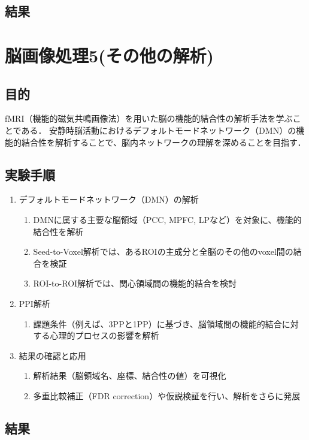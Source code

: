 \documentclass{jlreq}
\begin{document}
\subsection{結果}

\section{脳画像処理5(その他の解析)}
\subsection{目的}
fMRI（機能的磁気共鳴画像法）を用いた脳の機能的結合性の解析手法を学ぶことである．
安静時脳活動におけるデフォルトモードネットワーク（DMN）の機能的結合性を解析することで、脳内ネットワークの理解を深めることを目指す．
\subsection{実験手順}
\begin{enumerate}
    \item デフォルトモードネットワーク（DMN）の解析
    \begin{enumerate}
        \item DMNに属する主要な脳領域（PCC, MPFC, LPなど）を対象に、機能的結合性を解析
        \item Seed-to-Voxel解析では、あるROIの主成分と全脳のその他のvoxel間の結合を検証
        \item ROI-to-ROI解析では、関心領域間の機能的結合を検討
    \end{enumerate}

    \item PPI解析 
    \begin{enumerate}
        \item 課題条件（例えば、3PPと1PP）に基づき、脳領域間の機能的結合に対する心理的プロセスの影響を解析
    \end{enumerate}

    \item 結果の確認と応用
    \begin{enumerate}
        \item 解析結果（脳領域名、座標、結合性の値）を可視化
        \item 多重比較補正（FDR correction）や仮説検証を行い、解析をさらに発展
    \end{enumerate}
\end{enumerate}
\subsection{結果}
\end{document}
